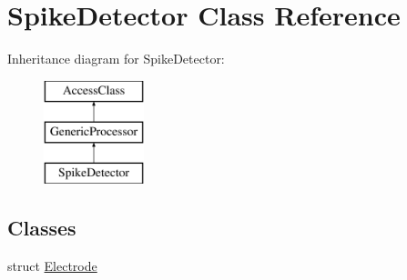\hypertarget{classSpikeDetector}{\section{Spike\-Detector Class Reference}
\label{classSpikeDetector}
}
Inheritance diagram for Spike\-Detector\-:\begin{figure}[H]
\begin{center}
\leavevmode
\includegraphics[height=3.000000cm]{classSpikeDetector}
\end{center}
\end{figure}
\subsection*{Classes}
\begin{DoxyCompactItemize}
\item 
struct \hyperlink{structSpikeDetector_1_1Electrode}{Electrode}
\end{DoxyCompactItemize}
